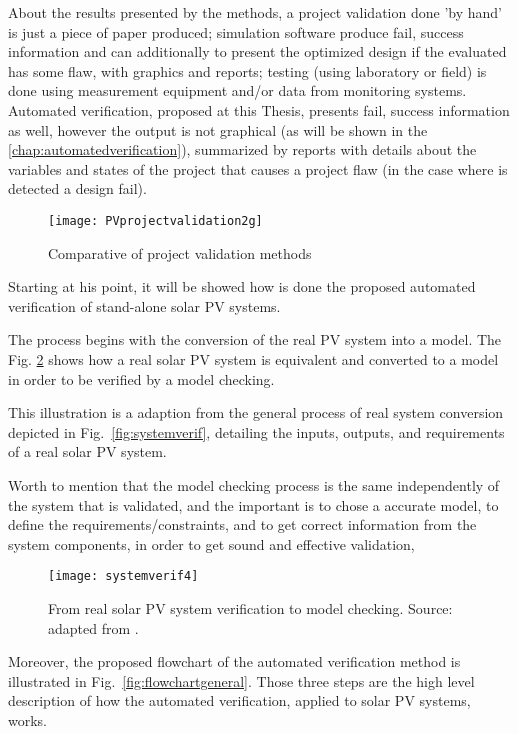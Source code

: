 About the results presented by the methods, a project validation done 'by hand' is just a piece of paper produced; simulation software produce fail, success information and can additionally to present the optimized design if the evaluated has some flaw, with graphics and reports; testing (using laboratory or field) is done using measurement equipment and/or data from monitoring systems. Automated verification, proposed at this Thesis, presents fail, success information as well, however the output is not graphical (as will be shown in the  \autoref{chap:automatedverification}), summarized by reports with details about the variables and states of the project that causes a project flaw (in the case where is detected a design fail).

\begin{figure}[h]
\texttt{[image: PVprojectvalidation2g]}
\centering
\caption{Comparative of project validation methods}
\label{fig:validation}
\end{figure}

Starting at his point, it will be showed how is done the proposed automated verification of stand-alone solar PV systems. 

The process begins with the conversion of the real PV system into a model. The Fig. \ref{fig:systemverif4} shows how a real solar PV system is equivalent and converted to a model in order to be verified by a model checking. 

This illustration is a adaption from the general process of real system conversion depicted in Fig.~\ref{fig:systemverif}, detailing the inputs, outputs, and requirements of a real solar PV system. 

Worth to mention that the model checking process is the same independently of the system that is validated, and the important is to chose a accurate model, to define the requirements/constraints, and to get correct information from the system components, in order to get sound and effective validation,

\begin{figure}[h]
\texttt{[image: systemverif4]}
\centering
\caption{From real solar PV system verification to model checking. Source: adapted from \cite{Clarke2008}.}
\label{fig:systemverif4}
\end{figure}

Moreover, the proposed flowchart of the automated verification method is illustrated in Fig.~\ref{fig:flowchartgeneral}. Those three steps are the high level description of how the automated verification, applied to solar PV systems, works.

